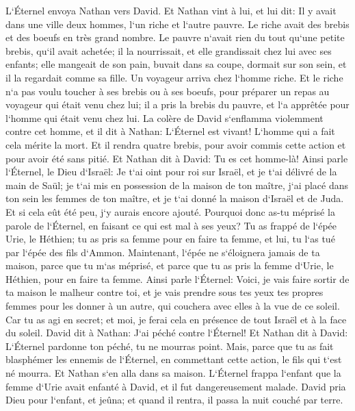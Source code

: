 \verse L`Éternel envoya Nathan vers David. Et Nathan vint à lui, et lui dit: Il y avait dans une ville deux hommes, l`un riche et l`autre pauvre. 
\verse Le riche avait des brebis et des boeufs en très grand nombre. 
\verse Le pauvre n`avait rien du tout qu`une petite brebis, qu`il avait achetée; il la nourrissait, et elle grandissait chez lui avec ses enfants; elle mangeait de son pain, buvait dans sa coupe, dormait sur son sein, et il la regardait comme sa fille. 
\verse Un voyageur arriva chez l`homme riche. Et le riche n`a pas voulu toucher à ses brebis ou à ses boeufs, pour préparer un repas au voyageur qui était venu chez lui; il a pris la brebis du pauvre, et l`a apprêtée pour l`homme qui était venu chez lui. 
\verse La colère de David s`enflamma violemment contre cet homme, et il dit à Nathan: L`Éternel est vivant! L`homme qui a fait cela mérite la mort. 
\verse Et il rendra quatre brebis, pour avoir commis cette action et pour avoir été sans pitié. 
\verse Et Nathan dit à David: Tu es cet homme-là! Ainsi parle l`Éternel, le Dieu d`Israël: Je t`ai oint pour roi sur Israël, et je t`ai délivré de la main de Saül; 
\verse je t`ai mis en possession de la maison de ton maître, j`ai placé dans ton sein les femmes de ton maître, et je t`ai donné la maison d`Israël et de Juda. Et si cela eût été peu, j`y aurais encore ajouté. 
\verse Pourquoi donc as-tu méprisé la parole de l`Éternel, en faisant ce qui est mal à ses yeux? Tu as frappé de l`épée Urie, le Héthien; tu as pris sa femme pour en faire ta femme, et lui, tu l`as tué par l`épée des fils d`Ammon. 
\verse Maintenant, l`épée ne s`éloignera jamais de ta maison, parce que tu m`as méprisé, et parce que tu as pris la femme d`Urie, le Héthien, pour en faire ta femme. 
\verse Ainsi parle l`Éternel: Voici, je vais faire sortir de ta maison le malheur contre toi, et je vais prendre sous tes yeux tes propres femmes pour les donner à un autre, qui couchera avec elles à la vue de ce soleil. 
\verse Car tu as agi en secret; et moi, je ferai cela en présence de tout Israël et à la face du soleil. 
\verse David dit à Nathan: J`ai péché contre l`Éternel! Et Nathan dit à David: L`Éternel pardonne ton péché, tu ne mourras point. 
\verse Mais, parce que tu as fait blasphémer les ennemis de l`Éternel, en commettant cette action, le fils qui t`est né mourra. 
\verse Et Nathan s`en alla dans sa maison. L`Éternel frappa l`enfant que la femme d`Urie avait enfanté à David, et il fut dangereusement malade. 
\verse David pria Dieu pour l`enfant, et jeûna; et quand il rentra, il passa la nuit couché par terre. 

